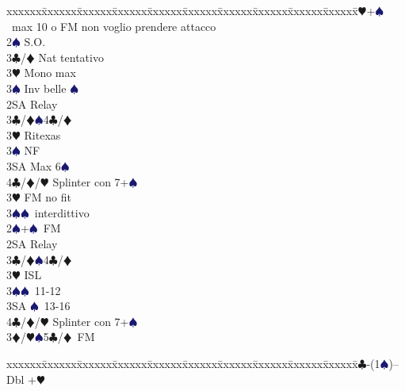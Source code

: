 \documentclass[a4paper,italian]{article}
\newcommand{\BC}{\textcolor{OliveGreen}{$\clubsuit$}}
\newcommand{\BD}{\textcolor{RedOrange}{$\vardiamondsuit$}}
\newcommand{\BH}{\textcolor{Red2}{$\varheartsuit${}}}
\newcommand{\BS}{\textcolor{MidnightBlue}{$\spadesuit${}}}
\newenvironment{bidtable}
{\begin{tabbing}

    xxxxxx\=xxxxxx\=xxxxxx\=xxxxxx\=xxxxxx\=xxxxxx\=xxxxxx\=xxxxxx\=xxxxxx\=xxxxxx\=\kill}
{\end{tabbing} }%
\begin{document}
\begin{multicols}{2}
\begin{bidtable}
                                            2\BH {}+\BS\ max 10 o FM non voglio prendere attacco\+\\
                                            2\BS \> S.O.\+\\
                                            3\BC/\BD \> Nat tentativo\\
                                            3\BH \> Mono max\\
                                            3\BS \> Inv belle \BS \-\\
                                            2SA \> Relay\+\\
                                            3\BC/\BD {}\BS 4\BC /\BD \\
                                            3\BH \> Ritexas\+\\
                                            3\BS \> NF\-\\
                                            3SA \> Max 6\BS \\
                                            4\BC/\BD/\BH \> Splinter con 7+\BS \-\\
                                            3\BH \> FM no fit\\
                                            3\BS {}\BS\ interdittivo\-\\
                                            2\BS {}+\BS\ FM\+\\
                                            2SA \> Relay\+\\
                                            3\BC/\BD {}\BS 4\BC /\BD \\
                                            3\BH \> ISL\\
                                            3\BS {}\BS\ 11-12\\
                                            3SA \BS\ 13-16\\
                                            4\BC/\BD/\BH \> Splinter con 7+\BS \-\-\\
                                            3\BD/\BH {}\BS 5\BC /\BD\ FM\-
                                        \end{bidtable}
                                        \begin{bidtable}
                                            1\BC-(1\BS)--\+\\
                                            Dbl +\BH \+\\

\end{bidtable}
\end{multicols}
\end{document}
